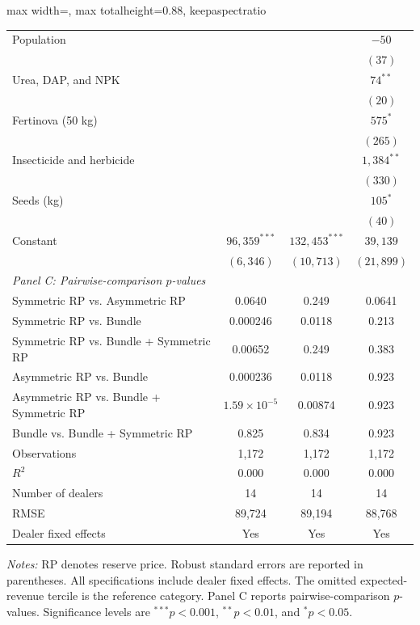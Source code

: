 \documentclass[11pt]{article}
\begin{document}
\begin{table}[!htbp]
\begin{adjustbox}{max width=\textwidth,
                  max totalheight=0.88\textheight,
                  keepaspectratio}
\begin{threeparttable}
\begin{tabular}{lccc}
Population
    & & & $-50$ \\
    & & & $(37)$ \\

Urea, DAP, and NPK
    & & & $74^{**}$ \\
    & & & $(20)$ \\

Fertinova (50 kg)
    & & & $575^{*}$ \\
    & & & $(265)$ \\

Insecticide and herbicide
    & & & $1{,}384^{**}$ \\
    & & & $(330)$ \\

Seeds (kg)
    & & & $105^{*}$ \\
    & & & $(40)$ \\

\addlinespace
Constant
    & $96{,}359^{***}$
    & $132{,}453^{***}$
    & $39{,}139$ \\
    & $(6{,}346)$
    & $(10{,}713)$
    & $(21{,}899)$ \\

\midrule
\multicolumn{4}{l}{\textit{Panel C: Pairwise-comparison $p$-values}} \\[2pt]

Symmetric RP vs. Asymmetric RP
    & 0.0640 & 0.249 & 0.0641 \\
Symmetric RP vs. Bundle
    & 0.000246 & 0.0118 & 0.213 \\
Symmetric RP vs. Bundle + Symmetric RP
    & 0.00652 & 0.249 & 0.383 \\
Asymmetric RP vs. Bundle
    & 0.000236 & 0.0118 & 0.923 \\
Asymmetric RP vs. Bundle + Symmetric RP
    & $1.59\times10^{-5}$ & 0.00874 & 0.923 \\
Bundle vs. Bundle + Symmetric RP
    & 0.825 & 0.834 & 0.923 \\

\midrule
Observations
    & 1,172 & 1,172 & 1,172 \\
$R^{2}$
    & 0.000 & 0.000 & 0.000 \\
Number of dealers
    & 14 & 14 & 14 \\
RMSE
    & 89,724 & 89,194 & 88,768 \\
Dealer fixed effects
    & Yes & Yes & Yes \\
\bottomrule
\end{tabular}

\begin{tablenotes}[flushleft]
\footnotesize
\item \textit{Notes:} RP denotes reserve price. Robust standard errors are
reported in parentheses. All specifications include dealer fixed effects.
The omitted expected-revenue tercile is the reference category. Panel C
reports pairwise-comparison $p$-values. Significance levels are
$^{***}p<0.001$, $^{**}p<0.01$, and $^{*}p<0.05$.
\end{tablenotes}


\end{threeparttable}
\end{adjustbox}
\end{table}
\end{document}
